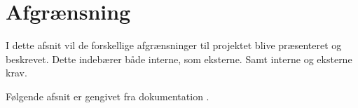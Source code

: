 \chapter{Afgrænsning}

I dette afsnit vil de forskellige afgrænsninger til projektet blive præsenteret og beskrevet. Dette indebærer både interne, som eksterne. Samt interne og eksterne krav.

Følgende afsnit er gengivet fra dokumentation .